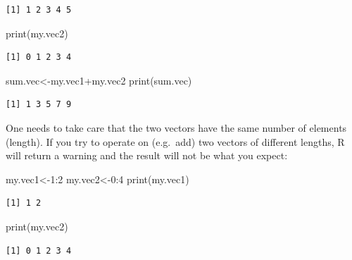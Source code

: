 \documentclass[
  letterpaper,
  DIV=11,
  numbers=noendperiod]{scrreprt}
\newenvironment{Shaded}{\begin{snugshade}}{\end{snugshade}}
\newcommand{\DecValTok}[1]{\textcolor[rgb]{0.68,0.00,0.00}{#1}}
\newcommand{\FunctionTok}[1]{\textcolor[rgb]{0.28,0.35,0.67}{#1}}
\newcommand{\NormalTok}[1]{\textcolor[rgb]{0.00,0.23,0.31}{#1}}
\newcommand{\OtherTok}[1]{\textcolor[rgb]{0.00,0.23,0.31}{#1}}
\newcommand{\SpecialCharTok}[1]{\textcolor[rgb]{0.37,0.37,0.37}{#1}}
\begin{document}
\begin{verbatim}
[1] 1 2 3 4 5
\end{verbatim}

\begin{Shaded}
\begin{Highlighting}[]
\FunctionTok{print}\NormalTok{(my.vec2)}
\end{Highlighting}
\end{Shaded}

\begin{verbatim}
[1] 0 1 2 3 4
\end{verbatim}

\begin{Shaded}
\begin{Highlighting}[]
\NormalTok{sum.vec}\OtherTok{\textless{}{-}}\NormalTok{my.vec1}\SpecialCharTok{+}\NormalTok{my.vec2}
\FunctionTok{print}\NormalTok{(sum.vec)}
\end{Highlighting}
\end{Shaded}

\begin{verbatim}
[1] 1 3 5 7 9
\end{verbatim}

One needs to take care that the two vectors have the same number of
elements (length). If you try to operate on (e.g.~add) two vectors of
different lengths, R will return a warning and the result will not be
what you expect:

\begin{Shaded}
\begin{Highlighting}[]
\NormalTok{my.vec1}\OtherTok{\textless{}{-}}\DecValTok{1}\SpecialCharTok{:}\DecValTok{2}
\NormalTok{my.vec2}\OtherTok{\textless{}{-}}\DecValTok{0}\SpecialCharTok{:}\DecValTok{4}
\FunctionTok{print}\NormalTok{(my.vec1)}
\end{Highlighting}
\end{Shaded}

\begin{verbatim}
[1] 1 2
\end{verbatim}

\begin{Shaded}
\begin{Highlighting}[]
\FunctionTok{print}\NormalTok{(my.vec2)}
\end{Highlighting}
\end{Shaded}

\begin{verbatim}
[1] 0 1 2 3 4
\end{verbatim}
\end{document}
